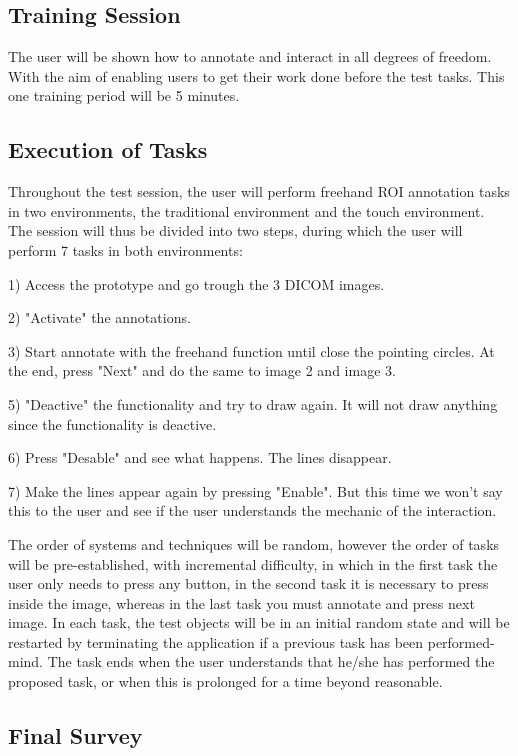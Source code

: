 \documentclass{article}
\begin{document}
\subsection{Training Session}

The user will be shown how to annotate and interact in all degrees of freedom. With the aim of enabling users to get their work done before the test tasks. This one training period will be 5 minutes.

\subsection{Execution of Tasks}

Throughout the test session, the user will perform freehand ROI annotation tasks in two environments, the traditional environment and the touch environment. The session will thus be divided into two steps, during which the user will perform 7 tasks in both environments:

1) Access the prototype and go trough the 3 DICOM images.

2) "Activate" the annotations.

3) Start annotate with the freehand function until close the pointing circles. At the end, press "Next" and do the same to image 2 and image 3.

5) "Deactive" the functionality and try to draw again. It will not draw anything since the functionality is deactive.

6) Press "Desable" and see what happens. The lines disappear.

7) Make the lines appear again by pressing "Enable". But this time we won't say this to the user and see if the user understands the mechanic of the interaction.

The order of systems and techniques will be random, however the order of tasks will be pre-established, with incremental difficulty, in which in the first task the user only needs to press any button, in the second task it is necessary to press inside the image, whereas in the last task you must annotate and press next image. In each task, the test objects will be in an initial random state and will be restarted by terminating the application if a previous task has been performed-mind. The task ends when the user understands that he/she has performed the proposed task, or when this is prolonged for a time beyond reasonable.

\clearpage

\subsection{Final Survey}
\end{document}
